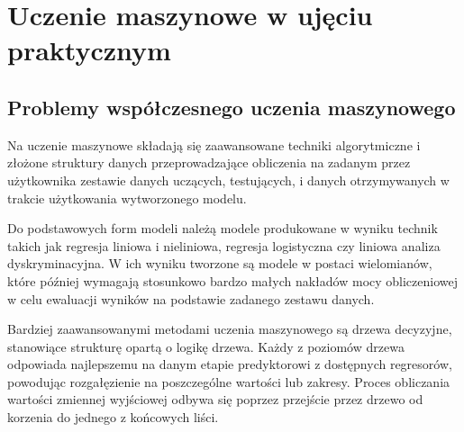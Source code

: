 \chapter{Uczenie maszynowe w ujęciu praktycznym}
\section{Problemy współczesnego uczenia maszynowego}

Na uczenie maszynowe składają się zaawansowane techniki algorytmiczne i złożone struktury danych przeprowadzające obliczenia na zadanym przez użytkownika zestawie danych uczących, testujących, i danych otrzymywanych w trakcie użytkowania wytworzonego modelu. 

Do podstawowych form modeli należą modele produkowane w wyniku technik takich jak regresja liniowa i nieliniowa, regresja logistyczna czy liniowa analiza dyskryminacyjna. W ich wyniku tworzone są modele w postaci wielomianów, które później wymagają stosunkowo bardzo małych nakładów mocy obliczeniowej w celu ewaluacji wyników na podstawie zadanego zestawu danych.

Bardziej zaawansowanymi metodami uczenia maszynowego są drzewa decyzyjne, stanowiące strukturę opartą o logikę drzewa. Każdy z poziomów drzewa odpowiada najlepszemu na danym etapie predyktorowi z dostępnych regresorów, powodując rozgałęzienie na poszczególne wartości lub zakresy. Proces obliczania wartości zmiennej wyjściowej odbywa się poprzez przejście przez drzewo od korzenia do jednego z końcowych liści.

